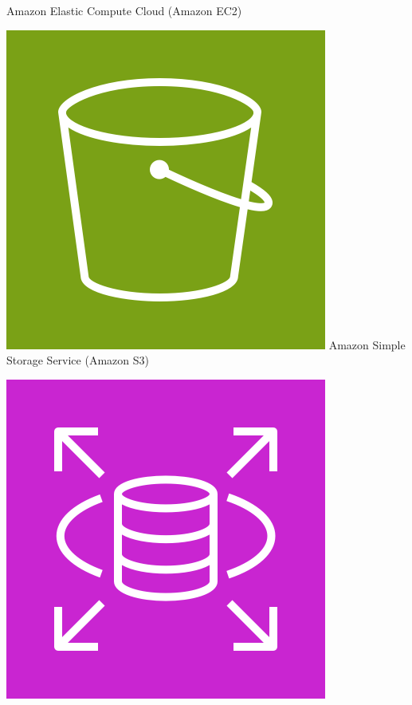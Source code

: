 \begin{frame}[t]{\ftitle}
\begin{minipage}{\textwidth}
\begin{minipage}[t]{.32\textwidth}
            {\tiny Amazon Elastic Compute Cloud (Amazon EC2)\cite{aws}}
        \end{minipage}
        \begin{minipage}[t]{.32\textwidth}
            \centering
            \includegraphics[keepaspectratio,width=\textwidth]{Arch_Amazon-Simple-Storage-Service_64@5x.png}
            {\tiny Amazon Simple Storage Service (Amazon S3)\cite{aws}}
        \end{minipage}
        \begin{minipage}[t]{.32\textwidth}
            \centering
            \includegraphics[keepaspectratio,width=\textwidth]{Arch_Amazon-RDS_64@5x.png}\\

\end{minipage}
\end{minipage}
\end{frame}
